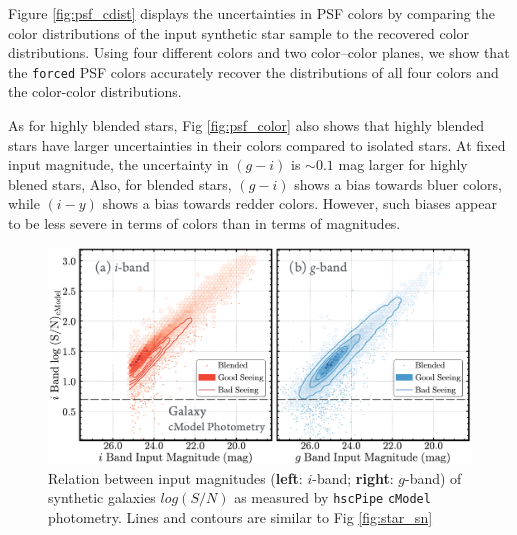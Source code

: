 \documentclass[useamsfonts]{pasj01}
\def\hscpipe{\texttt{hscPipe}}
\def\cmodel{\texttt{cModel}}
\def\forced{\texttt{forced}}
\begin{document}
Figure \ref{fig:psf_cdist} displays the uncertainties in PSF colors  by comparing the color distributions of the input synthetic star sample to the recovered color distributions. Using four different colors and two color--color planes, we show that the 
    \forced{} PSF colors accurately recover the distributions of all four colors 
    and the color-color distributions.

    As for highly blended stars, Fig \ref{fig:psf_color} also shows that highly blended stars have larger uncertainties in their colors compared to isolated stars. At fixed input magnitude, the  uncertainty in $(g-i)$ is ${\sim}0.1$ mag larger for highly blened stars, Also, for blended stars, $(g-i)$ shows a bias towards bluer colors, while $(i-y)$ shows a bias towards redder colors. However, such biases appear to be less severe in terms of colors than in terms of magnitudes.
    

\begin{figure}
    \begin{center}
        \includegraphics[width=\textwidth]{fig/synpipe_galaxy_sn}
    \end{center}
    \caption{
        Relation between input magnitudes (\textbf{left}: $i$-band; \textbf{right}:
        $g$-band) of synthetic galaxies $log(S/N)$ as measured by \hscpipe{} \cmodel{} photometry. Lines and contours are similar to Fig \ref{fig:star_sn}
        }
    \label{fig:cmodel_sn}
\end{figure}
\end{document}
